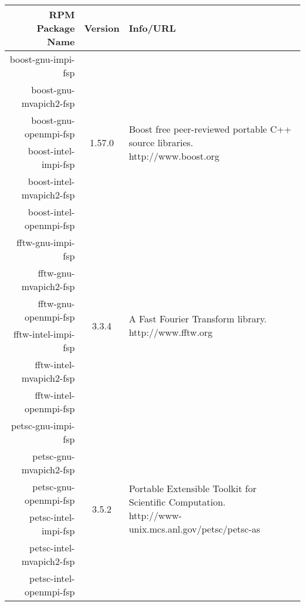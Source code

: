 \small
\begin{tabularx}{\textwidth}{r|c|X}
\toprule
{\bf RPM Package Name} & {\bf Version} & {\bf Info/URL}  \\ 
\midrule

boost-gnu-impi-fsp & 
\multirow{6}{*}{1.57.0} & 
\multirow{6}{\linewidth}{Boost free peer-reviewed portable C++ source libraries. \newline {\color{blue} http://www.boost.org}} \\ 
boost-gnu-mvapich2-fsp & 
& \\ 
boost-gnu-openmpi-fsp & 
& \\ 
boost-intel-impi-fsp & 
& \\ 
boost-intel-mvapich2-fsp & 
& \\ 
boost-intel-openmpi-fsp & 
& \\ 
\hline

fftw-gnu-impi-fsp & 
\multirow{6}{*}{3.3.4} & 
\multirow{6}{\linewidth}{A Fast Fourier Transform library. \newline {\color{blue} http://www.fftw.org}} \\ 
fftw-gnu-mvapich2-fsp & 
& \\ 
fftw-gnu-openmpi-fsp & 
& \\ 
fftw-intel-impi-fsp & 
& \\ 
fftw-intel-mvapich2-fsp & 
& \\ 
fftw-intel-openmpi-fsp & 
& \\ 
\hline

petsc-gnu-impi-fsp & 
\multirow{6}{*}{3.5.2} & 
\multirow{6}{\linewidth}{Portable Extensible Toolkit for Scientific Computation. \newline {\color{blue} http://www-unix.mcs.anl.gov/petsc/petsc-as}} \\ 
petsc-gnu-mvapich2-fsp & 
& \\ 
petsc-gnu-openmpi-fsp & 
& \\ 
petsc-intel-impi-fsp & 
& \\ 
petsc-intel-mvapich2-fsp & 
& \\ 
petsc-intel-openmpi-fsp & 
& \\ 
\hline

\bottomrule
\end{tabularx}
